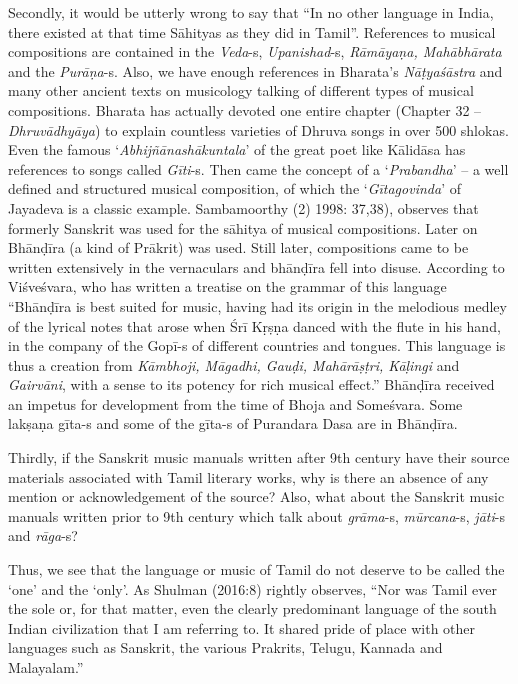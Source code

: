 Secondly, it would be utterly wrong to say that “In no other language in India, there existed at that time Sāhityas as they did in Tamil”. References to musical compositions are contained in the \textit{Veda}-s, \textit{Upanishad}-s, \textit{Rāmāyaṇa, Mahābhārata} and the \textit{Purāṇa}-s. Also, we have enough references in Bharata’s \textit{Nāṭyaśāstra} and many other ancient texts on musicology talking of different types of musical compositions. Bharata has actually devoted one entire chapter (Chapter 32 – \textit{Dhruvādhyāya}) to explain countless varieties of Dhruva songs in over 500 shlokas. Even the famous ‘\textit{Abhijñānashākuntala}’ of the great poet like Kālidāsa has references to songs called \textit{Gīti}-s. Then came the concept of a ‘\textit{Prabandha}’ – a well defined and structured musical composition, of which the ‘\textit{Gītagovinda}’ of Jayadeva is a classic example. Sambamoorthy (2) 1998: 37,38), observes that formerly Sanskrit was used for the sāhitya of musical compositions. Later on Bhānḍīra (a kind of Prākrit) was used. Still later, compositions came to be written extensively in the vernaculars and bhānḍīra fell into disuse. According to Viśveśvara, who has written a treatise on the grammar of this language “Bhānḍīra is best suited for music, having had its origin in the melodious medley of the lyrical notes that arose when Śrī Kṛṣṇa danced with the flute in his hand, in the company of the Gopī-s of different countries and tongues. This language is thus a creation from \textit{Kāmbhoji, Māgadhi, Gauḍi, Mahārāṣṭri, Kāḷingi} and \textit{Gairvāni}, with a sense to its potency for rich musical effect.” Bhānḍīra received an impetus for development from the time of Bhoja and Someśvara. Some lakṣaṇa gīta-s and some of the gīta-s of Purandara Dasa are in Bhānḍīra.

Thirdly, if the Sanskrit music manuals written after 9th century have their source materials associated with Tamil literary works, why is there an absence of any mention or acknowledgement of the source? Also, what about the Sanskrit music manuals written prior to 9th century which talk about \textit{grāma}-s, \textit{mūrcana}-s, \textit{jāti}-s and \textit{rāga}-s?

Thus, we see that the language or music of Tamil do not deserve to be called the ‘one’ and the ‘only’. As Shulman (2016:8) rightly observes, “Nor was Tamil ever the sole or, for that matter, even the clearly predominant language of the south Indian civilization that I am referring to. It shared pride of place with other languages such as Sanskrit, the various Prakrits, Telugu, Kannada and Malayalam.”


